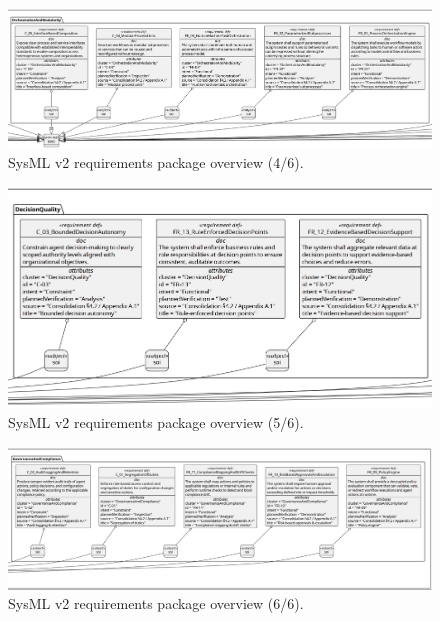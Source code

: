 \begin{figure}[htbp]
  \centering
  \includegraphics[width=\linewidth]{ressources/MAS/figures/MASRequirements/MASRequirements4.jpeg}
  \caption{SysML v2 requirements package overview (4/6).}
  \label{fig:mas-reqs-4}
\end{figure}
\begin{figure}[htbp]
  \centering
  \includegraphics[width=\linewidth]{ressources/MAS/figures/MASRequirements/MASRequirements5.jpeg}
  \caption{SysML v2 requirements package overview (5/6).}
  \label{fig:mas-reqs-5}
\end{figure}
\begin{figure}[htbp]
  \centering
  \includegraphics[width=\linewidth]{ressources/MAS/figures/MASRequirements/MASRequirements6.jpeg}
  \caption{SysML v2 requirements package overview (6/6).}
  \label{fig:mas-reqs-6}
\end{figure}

\clearpage


